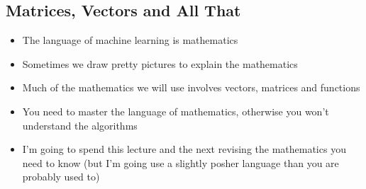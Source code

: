 \setcounter{outlineitem}{1}

\Outline %

\begin{slide}
\section[-1]{Matrices, Vectors and All That}

\begin{PauseHighLight}
  \begin{itemize}
  \item The language of machine learning is mathematics\pause
  \item Sometimes we draw pretty pictures to explain the mathematics\pause
  \item Much of the mathematics we will use involves vectors, matrices
    and functions\pause
  \item You need to master the language of mathematics, otherwise you
    won't understand the algorithms\pause
  \item I'm going to spend this lecture and the next revising the
    mathematics you need to know\pause{} (but I'm going use a slightly posher
    language than you are probably used to)\pauseb
  \end{itemize}
\end{PauseHighLight}

\end{slide}


